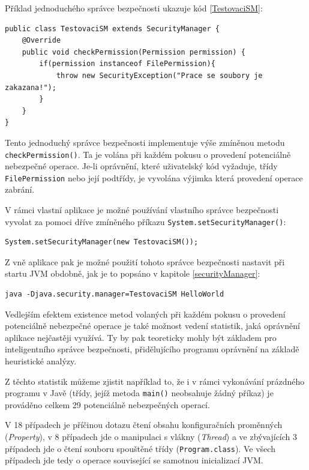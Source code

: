 Příklad jednoduchého správce bezpečnosti ukazuje kód \ref{TestovaciSM}:

\begin{lstlisting}[caption=Jednoduchý správce bezpečnosti, label=TestovaciSM]
public class TestovaciSM extends SecurityManager {
	@Override
	public void checkPermission(Permission permission) {
		if(permission instanceof FilePermission){
			throw new SecurityException("Prace se soubory je zakazana!");
		}
	}
}
\end{lstlisting}

Tento jednoduchý správce bezpečnosti implementuje výše zmíněnou metodu {\tt checkPermission()}.
Ta je volána při každém pokusu o provedení potenciálně nebezpečné operace.
Je-li oprávnění, které uživatelský kód vyžaduje, třídy {\tt FilePermission} nebo její podtřídy, je vyvolána výjimka která provedení operace zabrání.

V rámci vlastní aplikace je možné používání vlastního správce bezpečnosti vyvolat za pomoci dříve zmíněného příkazu {\tt System.setSecurityManager()}:

\begin{lstlisting}[caption=Nastavení správce bezpečnosti zevnitř JVM, label=setSM]
System.setSecurityManager(new TestovaciSM());
\end{lstlisting}

Z vně aplikace pak je možné použití tohoto správce bezpečnosti nastavit při startu JVM obdobně, jak je to popsáno v kapitole \ref{securityManager}:

\begin{lstlisting}[caption=Spuštění aplikace se správcem bezpečnosti, label=runWithSM]
java -Djava.security.manager=TestovaciSM HelloWorld
\end{lstlisting}

Vedlejším efektem existence metod volaných při každém pokusu o provedení potenciálně nebezpečné operace je také možnost vedení statistik, jaká oprávnění
aplikace nejčastěji využívá. Ty by pak teoreticky mohly být základem pro inteligentního správce bezpečnosti, přidělujícího programu oprávnění
na základě heuristické analýzy.

Z těchto statistik můžeme zjistit například to, že i v rámci vykonávání prázdného programu v Javě (třídy, jejíž metoda {\tt main()} neobsahuje žádný příkaz) je prováděno celkem 29 potenciálně nebezpečných operací.

V 18 případech je příčinou dotazu čtení obsahu konfiguračních proměnných ({\it Property}), v 8 případech jde o manipulaci s vlákny ({\it Thread}) a ve zbývajících 3 případech jde o čtení souboru spouštěné třídy ({\tt Program.class}). Ve všech případech jde tedy o operace související se samotnou inicializací JVM.

